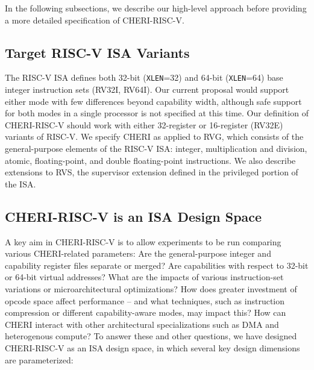 In the following subsections, we describe our high-level approach before
providing a more detailed specification of CHERI-RISC-V.

\subsection{Target RISC-V ISA Variants}

The RISC-V ISA defines both 32-bit (\texttt{XLEN}=32) and 64-bit
(\texttt{XLEN}=64) base integer instruction
sets (RV32I, RV64I). 
Our current proposal would support either mode with few differences beyond
capability width, although safe support for both modes in a single processor
is not specified at this time.
Our definition of CHERI-RISC-V should work with either 32-register or
16-register (RV32E) variants of RISC-V.
We specify CHERI as applied to RVG, which consists of the general-purpose
elements of the RISC-V ISA: integer, multiplication and division,
atomic, floating-point, and double floating-point instructions.
We also describe extensions to RVS, the supervisor extension defined in the
privileged portion of the ISA.

\subsection{CHERI-RISC-V is an ISA Design Space}

A key aim in CHERI-RISC-V is to allow experiments to be run comparing various
CHERI-related parameters: Are the general-purpose integer and capability
register files separate or merged?  Are capabilities with respect to 32-bit or
64-bit virtual addresses?  What are the impacts of various instruction-set
variations or microarchitectural optimizations?  How does greater investment
of opcode space affect performance -- and what techniques, such as instruction
compression or different capability-aware modes, may impact this?  How can
CHERI interact with other architectural specializations such as DMA and
heterogenous compute?
To answer these and other questions, we have designed CHERI-RISC-V as an ISA
design space, in which several key design dimensions are parameterized:

